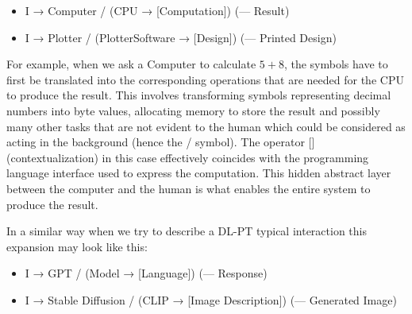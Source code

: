 \begin{itemize}
	\singlespacing
	\item I → Computer / (CPU → [Computation]) (--- Result)
	\item I → Plotter / (PlotterSoftware → [Design]) (--- Printed Design)
\end{itemize}

For example, when we ask a Computer to calculate $5+8$, the symbols have to first be translated into the corresponding operations that are needed for the CPU to produce the result. This involves transforming symbols representing decimal numbers into byte values, allocating memory to store the result and possibly many other tasks that are not evident to the human which could be considered as acting in the background (hence the / symbol). The operator [] (contextualization) in this case effectively coincides with the programming language interface used to express the computation. This hidden abstract layer between the computer and the human is what enables the entire system to produce the result.

In a similar way when we try to describe a DL-PT typical interaction this expansion may look like this:

 \begin{itemize}
 	\singlespacing
 	\item I → GPT / (Model → [Language]) (--- Response)
 	\item I → Stable Diffusion / (CLIP → [Image Description]) (--- Generated Image)
 \end{itemize}

